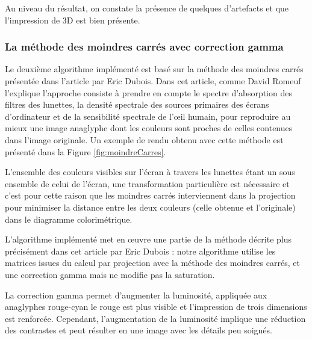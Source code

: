 
	Au niveau du résultat, on constate la présence de quelques d'artefacts et que l'impression de 3D est bien présente.
\subsubsection{La méthode des moindres carrés avec correction gamma}
	Le deuxième algorithme implémenté est basé sur la méthode des moindres carrés présentée dans l'article \cite{algoDubois} par Eric Dubois. Dans cet article, comme David Romeuf l'explique \cite{explicationAlgoDubois} l'approche consiste à prendre en compte le spectre d'absorption des filtres des lunettes, la densité spectrale des sources primaires des écrans d'ordinateur et de la sensibilité spectrale de l'œil humain, pour reproduire au mieux une image anaglyphe dont les couleurs sont proches de celles contenues dans l'image originale. Un exemple de rendu obtenu avec cette méthode est présenté dans la Figure \ref{fig:moindreCarres}.
	
	L'ensemble des couleurs visibles sur l'écran à travers les lunettes étant un sous ensemble de celui de l'écran, une transformation particulière est nécessaire et c'est pour cette raison que les moindres carrés interviennent dans la projection pour minimiser la distance entre les deux couleurs (celle obtenue et l'originale) dans le diagramme colorimétrique.
	
	L'algorithme implémenté met en \oe uvre une partie de la méthode décrite plus précisément dans cet article par Eric Dubois \cite{algoMoindreCarres} : notre algorithme utilise les matrices issues du calcul par projection avec la méthode des moindres carrés, et une correction gamma mais ne modifie pas la saturation.
	
	La correction gamma permet d'augmenter la luminosité, appliquée aux anaglyphes rouge-cyan le rouge est plus visible et l'impression de trois dimensions est renforcée. Cependant, l'augmentation de la luminosité implique une réduction des contrastes et peut résulter en une image avec les détails peu soignés.

